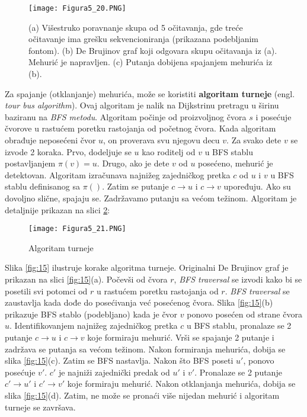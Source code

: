 \documentclass[12pt,oneside]{memoir}
\begin{document}
\newpage

\begin{figure}[!ht]
\centering
\texttt{[image: Figura5\_20.PNG]}
\caption{(a) Višestruko poravnanje skupa od 5 očitavanja, gde treće očitavanje ima grešku sekvencioniranja (prikazana podebljanim fontom). (b) De Brujinov graf koji odgovara skupu očitavanja iz (a). Mehurić je napravljen. (c) Putanja dobijena spajanjem mehurića iz (b).}
\label{fig:133}
\end{figure}

Za spajanje (otklanjanje) mehurića, može se koristiti \textbf{algoritam turneje} (engl. \textit{tour bus algorithm}). Ovaj algoritam je nalik na Dijkstrinu pretragu u širinu baziranu na \textit{BFS metodu}. Algoritam počinje od proizvoljnog čvora $s$ i posećuje čvorove u rastućem poretku rastojanja od početnog čvora. Kada algoritam obrađuje neposećeni čvor $u$, on proverava svu njegovu decu $v$. Za svako dete $v$ se izvode 2 koraka. Prvo, dodeljuje se $u$ kao roditelj od $v$ u BFS stablu postavljanjem $\pi (v) = u$. Drugo, ako je dete $v$ od $u$ posećeno, mehurić je detektovan. Algoritam izračunava najnižeg zajedničkog pretka $c$ od $u$ i $v$ u BFS stablu definisanog sa $\pi ()$. Zatim se putanje $c \rightarrow u$ i $c \rightarrow v$ upoređuju. Ako su dovoljno slične, spajaju se. Zadržavamo putanju sa većom težinom. Algoritam je detaljnije prikazan na slici \ref{fig:14}:

\newpage

\begin{figure}[!ht]
\centering
\texttt{[image: Figura5\_21.PNG]}
\caption{Algoritam turneje}
\label{fig:14}
\end{figure}


Slika \ref{fig:15} ilustruje korake algoritma turneje. Originalni De Brujinov graf je prikazan na slici \ref{fig:15}(a). Počevši od čvora $r$, \textit{BFS traversal} se izvodi kako bi se posetili svi potomci od $r$ u rastućem poretku rastojanja od $r$. \textit{BFS traversal} se zaustavlja kada dođe do posećivanja već posećenog čvora. Slika \ref{fig:15}(b) prikazuje BFS stablo (podebljano) kada je čvor $v$ ponovo posećen od strane čvora $u$. Identifikovanjem najnižeg zajedničkog pretka $c$ u BFS stablu, pronalaze se 2 putanje $c \rightarrow u$ i $c \rightarrow v$ koje formiraju mehurić. Vrši se spajanje 2 putanje i zadržava se putanja sa većom težinom. Nakon formiranja mehurića, dobija se slika \ref{fig:15}(c). Zatim se BFS nastavlja. Nakon što BFS poseti $u'$, ponovo posećuje $v'$. $c'$ je najniži zajednički predak od $u'$ i $v'$. Pronalaze se 2 putanje $c' \rightarrow u'$ i $c' \rightarrow v'$ koje formiraju mehurić. Nakon otklanjanja mehurića, dobija se slika \ref{fig:15}(d). Zatim, ne može se pronaći više nijedan mehurić i algoritam turneje se završava.
\end{document}
